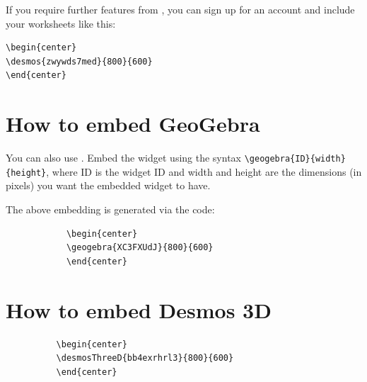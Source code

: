 \documentclass{ximera}
\begin{document}
If you require further features from
, you can sign up for an account
and include your worksheets like this:

\begin{verbatim}
\begin{center}
\desmos{zwywds7med}{800}{600}
\end{center}
\end{verbatim}
\begin{center}
\end{center}

\section{How to embed GeoGebra}

You can also use . Embed the
widget using the syntax \verb|\geogebra{ID}{width}{height}|, where ID
is the widget ID and width and height are the dimensions (in pixels)
you want the embedded widget to have.

\begin{center}
\end{center}

The above embedding is generated via the code:

\begin{verbatim}
            \begin{center}
            \geogebra{XC3FXUdJ}{800}{600}
            \end{center}
        \end{verbatim}

\section{How to embed Desmos 3D}

\begin{center}
\end{center}
\begin{verbatim}
          \begin{center}
          \desmosThreeD{bb4exrhrl3}{800}{600}
          \end{center}
      \end{verbatim}
\end{document}
